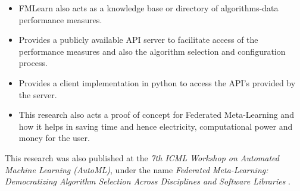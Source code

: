 \begin{itemize}
    \item FMLearn also acts as a knowledge base or directory of algorithms-data performance measures.
    \item Provides a publicly available API server to facilitate access of the performance measures and also the algorithm selection and configuration process.
    \item Provides a client implementation in python to access the API's provided by the server.
    \item This research also acts a proof of concept for Federated Meta-Learning and how it helps in saving time and hence electricity, computational power and money for the user.
\end{itemize}

This research was also published at the \textit{7th ICML Workshop on Automated Machine Learning (AutoML)}, under the name \textit{Federated Meta-Learning: Democratizing Algorithm Selection Across Disciplines and Software Libraries} \citep{arambakam_beel_2020}.
